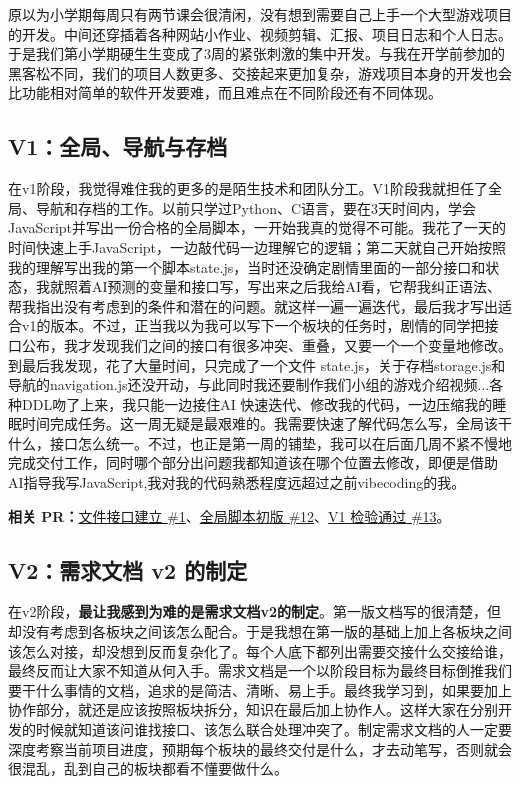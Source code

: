 原以为小学期每周只有两节课会很清闲，没有想到需要自己上手一个大型游戏项目的开发。中间还穿插着各种网站小作业、视频剪辑、汇报、项目日志和个人日志。于是我们第小学期硬生生变成了3周的紧张刺激的集中开发。与我在开学前参加的黑客松不同，我们的项目人数更多、交接起来更加复杂，游戏项目本身的开发也会比功能相对简单的软件开发要难，而且难点在不同阶段还有不同体现。

\subsection{V1：全局、导航与存档}

在v1阶段，我觉得难住我的更多的是陌生技术和团队分工。V1阶段我就担任了全局、导航和存档的工作。以前只学过Python、C语言，要在3天时间内，学会JavaScript并写出一份合格的全局脚本，一开始我真的觉得不可能。我花了一天的时间快速上手JavaScript，一边敲代码一边理解它的逻辑；第二天就自己开始按照我的理解写出我的第一个脚本state.js，当时还没确定剧情里面的一部分接口和状态，我就照着AI预测的变量和接口写，写出来之后我给AI看，它帮我纠正语法、帮我指出没有考虑到的条件和潜在的问题。就这样一遍一遍迭代，最后我才写出适合v1的版本。不过，正当我以为我可以写下一个板块的任务时，剧情的同学把接口公布，我才发现我们之间的接口有很多冲突、重叠，又要一个一个变量地修改。到最后我发现，花了大量时间，只完成了一个文件 state.js，关于存档storage.js和导航的navigation.js还没开动，与此同时我还要制作我们小组的游戏介绍视频...各种DDL吻了上来，我只能一边接住AI 快速迭代、修改我的代码，一边压缩我的睡眠时间完成任务。这一周无疑是最艰难的。我需要快速了解代码怎么写，全局该干什么，接口怎么统一。不过，也正是第一周的铺垫，我可以在后面几周不紧不慢地完成交付工作，同时哪个部分出问题我都知道该在哪个位置去修改，即便是借助AI指导我写JavaScript,我对我的代码熟悉程度远超过之前vibecoding的我。

\textbf{相关 PR：}\href{https://github.com/214notfound/jiedeng/pull/1}{文件接口建立 \#1}、\href{https://github.com/214notfound/jiedeng/pull/12}{全局脚本初版 \#12}、\href{https://github.com/214notfound/jiedeng/pull/13}{V1 检验通过 \#13}。

\subsection{V2：需求文档 v2 的制定}

在v2阶段，\textbf{最让我感到为难的是需求文档v2的制定}。第一版文档写的很清楚，但却没有考虑到各板块之间该怎么配合。于是我想在第一版的基础上加上各板块之间该怎么对接，却没想到反而复杂化了。每个人底下都列出需要交接什么交接给谁，最终反而让大家不知道从何入手。需求文档是一个以阶段目标为最终目标倒推我们要干什么事情的文档，追求的是简洁、清晰、易上手。最终我学习到，如果要加上协作部分，就还是应该按照板块拆分，知识在最后加上协作人。这样大家在分别开发的时候就知道该问谁找接口、该怎么联合处理冲突了。制定需求文档的人一定要深度考察当前项目进度，预期每个板块的最终交付是什么，才去动笔写，否则就会很混乱，乱到自己的板块都看不懂要做什么。

